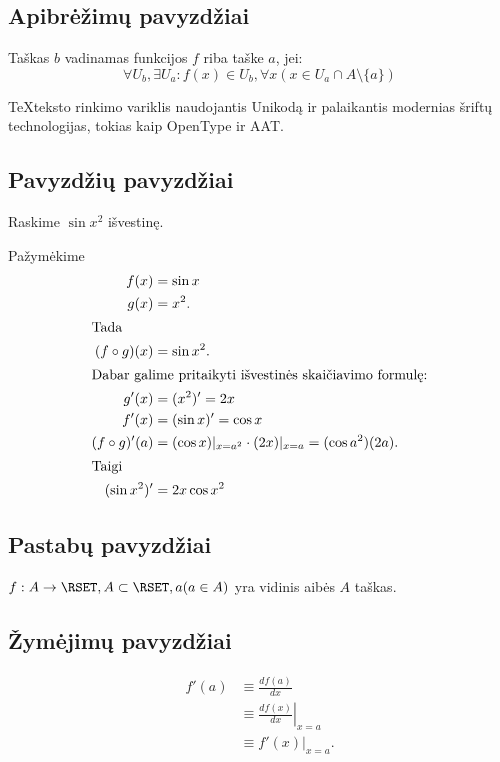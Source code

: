 \subsection{Apibrėžimų pavyzdžiai}

\begin{defn}
  \label{limfed}
  Taškas $b$ vadinamas funkcijos $f$ riba taške $a$, jei:
  \begin{equation*}
    \forall U_b, \exists U_a : f(x) \in U_b,
    \forall x (x \in U_a \cap A \setminus \{a\})
  \end{equation*}
\end{defn}

\begin{defn}[\XeTeX]
  \TeX teksto rinkimo variklis naudojantis Unikodą ir palaikantis
  modernias šriftų technologijas, tokias kaip OpenType ir AAT.
\end{defn}

\subsection{Pavyzdžių pavyzdžiai}

\begin{exmp}
  Raskime $\sin x^{2}$ išvestinę.

  Pažymėkime
  \begin{align*}
    f(x) &= \sin x \\
    g(x) &= x^{2}. \\
    \intertext{Tada}
    (f \circ g)(x) &= \sin x^{2}.\\
    \intertext{Dabar galime pritaikyti išvestinės skaičiavimo formulę:}
    g'(x) &= (x^{2})' = 2x \\
    f'(x) &= (\sin x)' = \cos x \\
    (f \circ g)'(a) &= (\cos x)|_{x = a^{2}} \cdot (2x)|_{x=a}
      = (\cos a^2)(2a). \\
    \intertext{Taigi}
    (\sin x^{2})' &= 2x \cos x^{2}
  \end{align*}

\end{exmp}

\subsection{Pastabų pavyzdžiai}

\begin{note}
  $f : A \to \RSET, A \subset \RSET, a(a \in A)$ yra vidinis aibės
  $A$ taškas.
\end{note}

\subsection{Žymėjimų pavyzdžiai}

\begin{notation}
  \begin{align*}
    f'(a)
    &\equiv \frac{d f(a)}{dx} \\
    &\equiv \left. \frac{d f(x)}{dx} \right|_{x = a} \\
    &\equiv \left. f'(x) \right|_{x = a}.
  \end{align*}
\end{notation}
